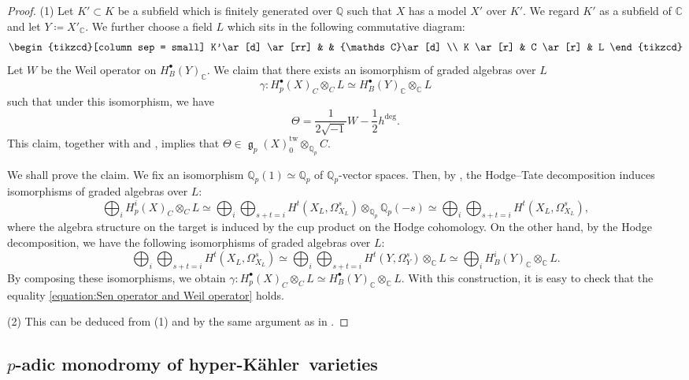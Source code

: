 \documentclass[12pt,reqno]{amsart}
\theoremstyle{definition}
\newcommand{\Q}{{\mathds Q}}
\newcommand{\C}{{\mathds C}}
\renewcommand\ge{\mathop{\mathfrak{g}}\nolimits}
\newcommand{\hk}{hyper-Kähler~}
\DeclareMathOperator{\tw}{tw}
\numberwithin{equation}{section}
\begin{document}
\begin{proof}
(1)
Let $K' \subset K$ be a subfield which is finitely generated over $\Q$ such that
$X$ has a model $X'$ over $K'$.
We regard $K'$ as a subfield of $\C$ and 
let $Y\coloneqq X'_\C$.
We further choose a field
$L$ which sits in the following commutative diagram:
\[
\begin{tikzcd}[column sep = small]
    K'\ar[d] \ar[rr] & & \C \ar[d] \\
    K \ar[r] & C \ar[r] & L
\end{tikzcd}
\]
Let $W$ be the Weil operator on $H_{B}^\bullet(Y)_\C$.
We claim that there exists an isomorphism of graded algebras over $L$
\[
\gamma \colon
H^{\bullet}_{p}(X)_C \otimes_{C} L \simeq
H^{\bullet}_{B}(Y)_\C \otimes_\C L
\]
such that under this isomorphism, we have
\begin{equation}\label{equation:Sen operator and Weil operator}
    \Theta = \frac{1}{2\sqrt{-1}} W - \frac{1}{2}h^{\deg}.
\end{equation}
This claim, together with  and , implies that
$\Theta \in \ge_p(X)^{\tw}_0 \otimes_{\Q_p} C$.

We shall prove the claim.
We fix an isomorphism $\Q_p(1) \simeq \Q_p$ of $\Q_p$-vector spaces.
Then, by \cite[Theorem A1, (A1.2)]{Tsuji02},
the Hodge--Tate decomposition induces isomorphisms of graded algebras over $L$:
\[
\bigoplus_i H^{i}_{p}(X)_C \otimes_{C} L \simeq \bigoplus_{i}\bigoplus_{s+t=i} H^t(X_L, \Omega^s_{X_L}) \otimes_{\Q_p} \Q_p(-s)
\simeq \bigoplus_{i}\bigoplus_{s+t=i} H^t(X_L, \Omega^s_{X_L}),
\]
where the algebra structure on the target is induced by the cup product on the Hodge cohomology.
On the other hand, by the Hodge decomposition,
we have the following isomorphisms of graded algebras over $L$:
\[
\bigoplus_{i}\bigoplus_{s+t=i} H^t(X_L, \Omega^s_{X_L})
\simeq
\bigoplus_{i}\bigoplus_{s+t=i} H^t(Y, \Omega^s_{Y}) \otimes_\C L
\simeq 
\bigoplus_{i} H^{i}_{B}(Y)_\C \otimes_\C L.
\]
By composing these isomorphisms, we obtain
$\gamma \colon
H^{\bullet}_{p}(X)_C \otimes_{C} L \simeq
H^{\bullet}_{B}(Y)_\C \otimes_\C L$.
With this construction, it is easy to check that the equality \eqref{equation:Sen operator and Weil operator} holds.

(2) This can be deduced from (1) and  by the same argument as in \cite[Lemma 6.7]{FFZ}.
\end{proof}



\subsection{$p$-adic monodromy of \hk varieties}\label{Section: p-adic monodromy operators of hyper kahler varieties}
\end{document}
